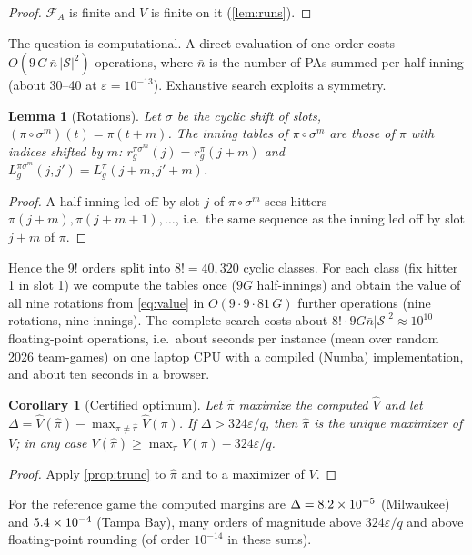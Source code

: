 \documentclass[11pt]{article}
\newtheorem{lemma}[theorem]{Lemma}
\newtheorem{corollary}[theorem]{Corollary}
\theoremstyle{definition}
\theoremstyle{remark}
\newcommand{\cS}{\mathcal{S}}
\newcommand{\cF}{\mathcal{F}}
\begin{document}
\begin{proof}
$\cF_A$ is finite and $V$ is finite on it (\cref{lem:runs}).
\end{proof}

The question is computational. A direct evaluation of one order costs $O(9\,G\,\bar n\,|\cS|^2)$
operations, where $\bar n$ is the number of PAs summed per half-inning (about 30--40 at
$\varepsilon=10^{-13}$). Exhaustive search exploits a symmetry.

\begin{lemma}[Rotations]\label{lem:rot}
Let $\sigma$ be the cyclic shift of slots, $(\pi\circ\sigma^m)(t)=\pi(t+m)$. The inning tables of
$\pi\circ\sigma^m$ are those of $\pi$ with indices shifted by $m$:
$r_g^{\pi\sigma^m}(j)=r_g^\pi(j+m)$ and $L_g^{\pi\sigma^m}(j,j')=L_g^\pi(j+m,j'+m)$.
\end{lemma}

\begin{proof}
A half-inning led off by slot $j$ of $\pi\circ\sigma^m$ sees hitters $\pi(j+m),\pi(j+m+1),\dots$,
i.e.\ the same sequence as the inning led off by slot $j+m$ of $\pi$.
\end{proof}

Hence the 9! orders split into $8!=40{,}320$ cyclic classes. For each class (fix hitter 1 in
slot 1) we compute the tables once ($9G$ half-innings) and obtain the value of all nine rotations
from \eqref{eq:value} in $O(9\cdot9\cdot81\,G)$ further operations (nine rotations, nine innings). The complete search costs about
$8!\cdot9G\bar n|\cS|^2\approx10^{10}$ floating-point operations, i.e.\ about
\EfouraExhaustiveSeconds{} seconds per instance (mean over \EfouraN{} random 2026 team-games) on one
laptop CPU with a compiled (Numba) implementation, and about ten seconds in a browser.

\begin{corollary}[Certified optimum]\label{cor:cert}
Let $\hat\pi$ maximize the computed $\hat V$ and let $\Delta=\hat V(\hat\pi)-\max_{\pi\ne\hat\pi}\hat V(\pi)$.
If $\Delta>324\varepsilon/q$, then $\hat\pi$ is the unique maximizer of $V$; in any case
$V(\hat\pi)\ge\max_\pi V(\pi)-324\varepsilon/q$.
\end{corollary}

\begin{proof}
Apply \cref{prop:trunc} to $\hat\pi$ and to a maximizer of $V$.
\end{proof}

For the reference game the computed margins are $\Delta=8.2\times10^{-5}$ (Milwaukee) and
$5.4\times10^{-4}$ (Tampa Bay), many orders of magnitude above $324\varepsilon/q$ and above
floating-point rounding (of order $10^{-14}$ in these sums).
\end{document}

